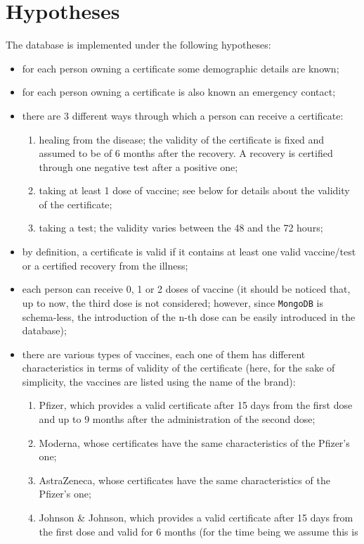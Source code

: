 \documentclass{article}
\begin{document}
\section{Hypotheses}
The database is implemented under the following hypotheses:
\begin{itemize}
    \item for each person owning a certificate some demographic details are known;
    \item for each person owning a certificate is also known an emergency contact;
    \item there are 3 different ways through which a person can receive a certificate:
    \begin{enumerate}
        \item healing from the disease; the validity of the certificate is fixed and assumed to be of 6 months after the recovery. A recovery is certified through one negative test after a positive one;
        \item taking at least 1 dose of vaccine; see below for details about the validity of the certificate;
        \item taking a test; the validity varies between the 48 and the 72 hours;
    \end{enumerate}
    \item by definition, a certificate is valid if it contains at least one valid vaccine/test or a certified recovery from the illness;
    \item each person can receive 0, 1 or 2 doses of vaccine (it should be noticed that, up to now, the third dose is not considered; however, since \verb|MongoDB| is schema-less, the introduction of the n-th dose can be easily introduced in the database);
\item there are various types of vaccines, each one of them has different characteristics in terms of validity of the certificate (here, for the sake of simplicity, the vaccines are listed using the name of the brand):
\begin{enumerate}
    \item Pfizer, which provides a valid certificate after 15 days from the first dose and up to 9 months after the administration of the second dose;
    \item Moderna, whose certificates have the same characteristics of the Pfizer's one;
    \item AstraZeneca, whose certificates have the same characteristics of the Pfizer's one;
    \item Johnson \& Johnson, which provides a valid certificate after 15 days from the first dose and valid for 6 months (for the time being we assume this is 

\end{enumerate}
\end{itemize}
\end{document}
